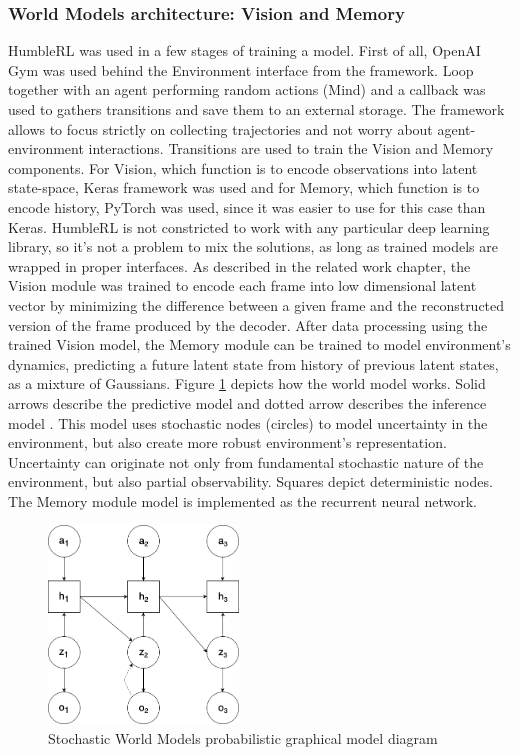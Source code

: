 \subsubsection{World Models architecture: Vision and Memory}
HumbleRL was used in a few stages of training a model. First of all, OpenAI Gym was used behind the Environment interface from the framework. Loop together with an agent performing random actions (Mind) and a callback was used to gathers transitions and save them to an external storage. The framework allows to focus strictly on collecting trajectories and not worry about agent-environment interactions.
Transitions are used to train the Vision and Memory components. For Vision, which function is to encode observations into latent state-space, Keras \cite{Code.Keras} framework was used and for Memory, which function is to encode history, PyTorch \cite{Code.PyTorch} was used, since it was easier to use for this case than Keras. HumbleRL is not constricted to work with any particular deep learning library, so it’s not a problem to mix the solutions, as long as trained models are wrapped in proper interfaces.
As described in the related work chapter, the Vision module was trained to encode each frame into low dimensional latent vector by minimizing the difference between a given frame and the reconstructed version of the frame produced by the decoder. After data processing using the trained Vision model, the Memory module can be trained to model environment's dynamics, predicting a future latent state from history of previous latent states, as a mixture of Gaussians.
Figure \ref{Fig.WorldModelsPHM} depicts how the world model works. Solid arrows describe the predictive model and dotted arrow describes the inference model . This model uses stochastic nodes (circles) to model uncertainty in the environment, but also create more robust environment's representation. Uncertainty can originate not only from fundamental stochastic nature of the environment, but also partial observability. Squares depict deterministic nodes. The Memory module model is implemented as the recurrent neural network.

\begin{figure}[H]
\includegraphics[width=0.45\textwidth,keepaspectratio]{figures/WorldModels/prob_graph_model.png}
\caption{Stochastic World Models probabilistic graphical model diagram}
\label{Fig.WorldModelsPHM}
\end{figure}

